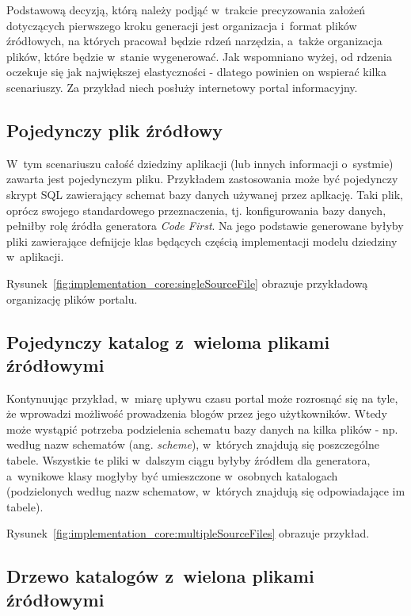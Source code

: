 Podstawową decyzją, którą należy podjąć w~trakcie precyzowania założeń dotyczących pierwszego kroku generacji jest organizacja i~format plików źródłowych, na których pracował będzie rdzeń narzędzia, a~także organizacja plików, które będzie w~stanie wygenerować.
Jak wspomniano wyżej, od rdzenia oczekuje się jak największej elastyczności - dlatego powinien on wspierać kilka scenariuszy.
Za przykład niech posłuży internetowy portal informacyjny.


\subsection{Pojedynczy plik źródłowy}

W~tym scenariuszu całość dziedziny aplikacji (lub innych informacji o~systmie) zawarta jest pojedynczym pliku.
Przykładem zastosowania może być pojedynczy skrypt SQL zawierający schemat bazy danych używanej przez aplkację.
Taki plik, oprócz swojego standardowego przeznaczenia, tj. konfigurowania bazy danych, pełniłby rolę źródła generatora \emph{Code First}.
Na jego podstawie generowane byłyby pliki zawierające defnijcje klas będących częścią implementacji modelu dziedziny w~aplikacji.

Rysunek~\ref{fig:implementation_core:singleSourceFile} obrazuje przykładową organizację plików portalu.




\subsection{Pojedynczy katalog z~wieloma plikami źródłowymi}

Kontynuując przykład, w~miarę upływu czasu portal może rozrosnąć się na tyle, że wprowadzi możliwość prowadzenia blogów przez jego użytkowników.
Wtedy może wystąpić potrzeba podzielenia schematu bazy danych na kilka plików - np. według nazw schematów (ang. \emph{scheme}), w~których znajdują się poszczególne tabele.
Wszystkie te pliki w~dalszym ciągu byłyby źródłem dla generatora, a~wynikowe klasy mogłyby być umieszczone w~osobnych katalogach (podzielonych według nazw schematow, w~których znajdują się odpowiadające im tabele).

Rysunek~\ref{fig:implementation_core:multipleSourceFiles} obrazuje przykład.




\subsection{Drzewo katalogów z~wielona plikami źródłowymi} \label{sec:core:files_structure:many_folders}

